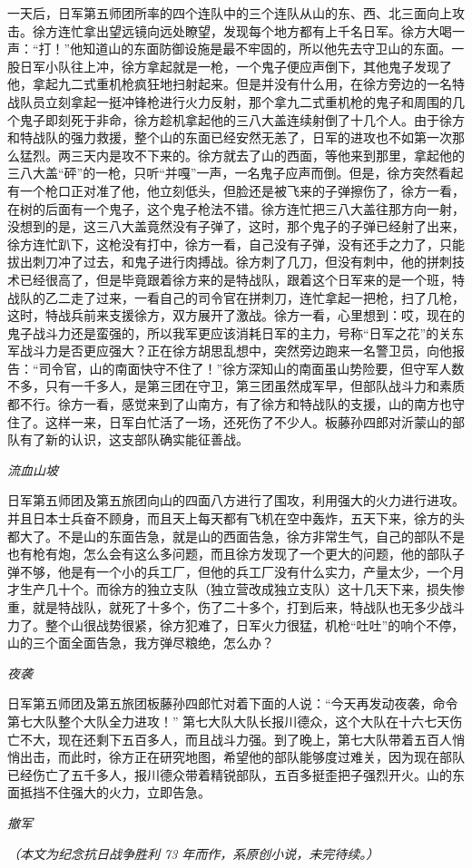 \documentclass[UTF8,a4paper,titlepage,twoside,10.5pt]{article}
\begin{document}
一天后，日军第五师团所率的四个连队中的三个连队从山的东、西、北三面向上攻击。徐方连忙拿出望远镜向远处瞭望，发现每个地方都有上千名日军。徐方大喝一声：“打！”他知道山的东面防御设施是最不牢固的，所以他先去守卫山的东面。一股日军小队往上冲，徐方拿起就是一枪，一个鬼子便应声倒下，其他鬼子发现了他，拿起九二式重机枪疯狂地扫射起来。但是并没有什么用，在徐方旁边的一名特战队员立刻拿起一挺冲锋枪进行火力反射，那个拿九二式重机枪的鬼子和周围的几个鬼子即刻死于非命，徐方趁机拿起他的三八大盖连续射倒了十几个人。由于徐方和特战队的强力救援，整个山的东面已经安然无恙了，日军的进攻也不如第一次那么猛烈。两三天内是攻不下来的。徐方就去了山的西面，等他来到那里，拿起他的三八大盖“砰”的一枪，只听“并嘎”一声，一名鬼子应声而倒。但是，徐方突然看起有一个枪口正对准了他，他立刻低头，但脸还是被飞来的子弹擦伤了，徐方一看，在树的后面有一个鬼子，这个鬼子枪法不错。徐方连忙把三八大盖往那方向一射，没想到的是，这三八大盖竟然没有子弹了，这时，那个鬼子的子弹已经射了出来，徐方连忙趴下，这枪没有打中，徐方一看，自己没有子弹，没有还手之力了，只能拔出刺刀冲了过去，和鬼子进行肉搏战。徐方刺了几刀，但没有刺中，他的拼刺技术已经很高了，但是毕竟跟着徐方来的是特战队，跟着这个日军来的是一个班，特战队的乙二走了过来，一看自己的司令官在拼刺刀，连忙拿起一把枪，扫了几枪，这时，特战兵前来支援徐方，双方展开了激战。徐方一看，心里想到：哎，现在的鬼子战斗力还是蛮强的，所以我军更应该消耗日军的主力，号称“日军之花”的关东军战斗力是否更应强大？正在徐方胡思乱想中，突然旁边跑来一名警卫员，向他报告：“司令官，山的南面快守不住了！”徐方深知山的南面虽山势险要，但守军人数不多，只有一千多人，是第三团在守卫，第三团虽然成军早，但部队战斗力和素质都不行。徐方一看，感觉来到了山南方，有了徐方和特战队的支援，山的南方也守住了。这样一来，日军白忙活了一场，还死伤了不少人。板藤孙四郎对沂蒙山的部队有了新的认识，这支部队确实能征善战。

\emph{流血山坡}

日军第五师团及第五旅团向山的四面八方进行了围攻，利用强大的火力进行进攻。并且日本士兵奋不顾身，而且天上每天都有飞机在空中轰炸，五天下来，徐方的头都大了。不是山的东面告急，就是山的西面告急，徐方非常生气，自己的部队不是也有枪有炮，怎么会有这么多问题，而且徐方发现了一个更大的问题，他的部队子弹不够，他是有一个小的兵工厂，但他的兵工厂没有什么实力，产量太少，一个月才生产几十个。而徐方的独立支队（独立营改成独立支队）这十几天下来，损失惨重，就是特战队，就死了十多个，伤了二十多个，打到后来，特战队也无多少战斗力了。整个山很战势很紧，徐方犯难了，日军火力很猛，机枪“吐吐”的响个不停，山的三个面全面告急，我方弹尽粮绝，怎么办？

\emph{夜袭}

日军第五师团及第五旅团板藤孙四郎忙对着下面的人说：“今天再发动夜袭，命令第七大队整个大队全力进攻！” 第七大队大队长报川德众，这个大队在十六七天伤亡不大，现在还剩下五百多人，而且战斗力强。到了晚上，第七大队带着五百人悄悄出击，而此时，徐方正在研究地图，希望他的部队能够度过难关，因为现在部队已经伤亡了五千多人，报川德众带着精锐部队，五百多挺歪把子强烈开火。山的东面抵挡不住强大的火力，立即告急。

\emph{撤军}

\emph{（本文为纪念抗日战争胜利 73 年而作，系原创小说，未完待续。）}
\end{document}
